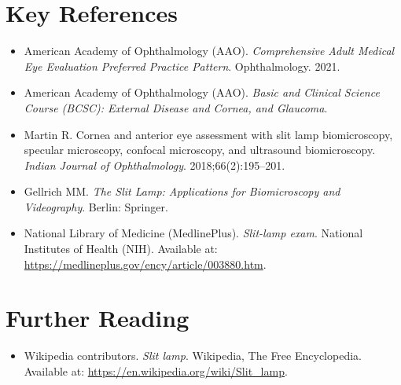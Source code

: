 \section{Key References}

\begin{itemize}
    \item American Academy of Ophthalmology (AAO). \textit{Comprehensive Adult Medical Eye Evaluation Preferred Practice Pattern}. Ophthalmology. 2021.
    \item American Academy of Ophthalmology (AAO). \textit{Basic and Clinical Science Course (BCSC): External Disease and Cornea, and Glaucoma}.
    \item Martin R. Cornea and anterior eye assessment with slit lamp biomicroscopy, specular microscopy, confocal microscopy, and ultrasound biomicroscopy. \textit{Indian Journal of Ophthalmology}. 2018;66(2):195--201.
    \item Gellrich MM. \textit{The Slit Lamp: Applications for Biomicroscopy and Videography}. Berlin: Springer.
    \item National Library of Medicine (MedlinePlus). \textit{Slit-lamp exam}. National Institutes of Health (NIH). Available at: \url{https://medlineplus.gov/ency/article/003880.htm}.
\end{itemize}

\section{Further Reading}
\begin{itemize}
  \item Wikipedia contributors. \textit{Slit lamp}. Wikipedia, The Free Encyclopedia. Available at: \url{https://en.wikipedia.org/wiki/Slit_lamp}.
\end{itemize}
